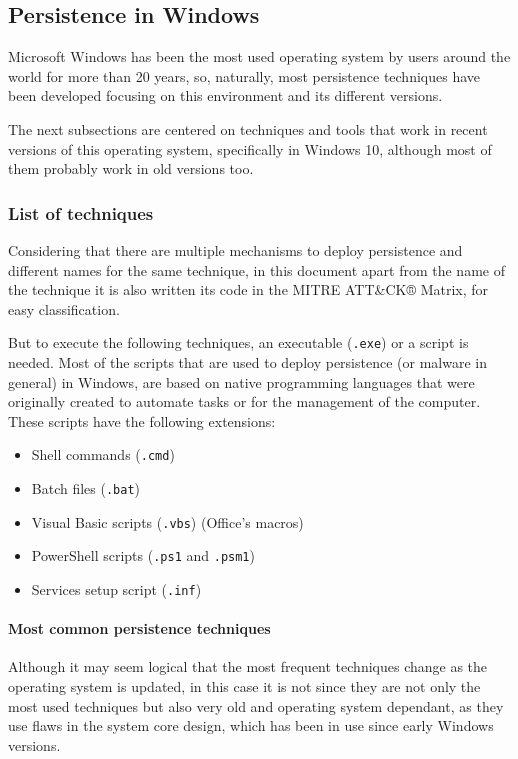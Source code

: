 \pagebreak
\subsection{Persistence in Windows}
\label{ssec:windows}

Microsoft Windows has been the most used operating system by users around the world for more than 20 years, so, naturally, most persistence techniques have been developed focusing on this environment and its different versions.

The next subsections are centered on techniques and tools that work in recent versions of this operating system, specifically in Windows 10, although most of them probably work in old versions too. 

\subsubsection{List of techniques}
\label{sssec:windowsTec}
Considering that there are multiple mechanisms to deploy persistence and different names for the same technique, in this document apart from the name of the technique it is also written its code in the MITRE ATT\&CK® Matrix\cite{MitreWeb}, for easy classification.

But to execute the following techniques, an executable (\texttt{.exe}) or a script is needed. Most of the scripts that are used to deploy persistence (or malware in general) in Windows, are based on native programming languages that were originally created to automate tasks or for the management of the computer. These scripts have the following extensions: 
\begin{itemize}
\item Shell commands (\texttt{.cmd})
\item Batch files (\texttt{.bat})
\item Visual Basic scripts (\texttt{.vbs}) (Office's macros)
\item PowerShell scripts (\texttt{.ps1} and \texttt{.psm1})
\item Services setup script (\texttt{.inf})
\end{itemize} 

\paragraph{Most common persistence techniques}
Although it may seem logical that the most frequent techniques change as the operating system is updated, in this case it is not since they are not only the most used techniques but also very old and operating system dependant, as they use flaws in the system core design, which has been in use since early Windows versions. 

